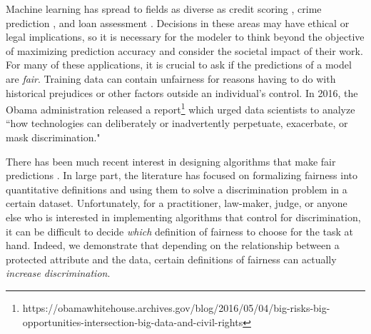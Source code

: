 Machine learning has spread to fields as diverse as credit scoring
\cite{khandani2010consumer}, crime prediction
\cite{brennan2009evaluating}, and loan assessment
\cite{mahoney2007method}. Decisions in these areas may have ethical or
legal implications, so it is necessary for the modeler to think beyond
the objective of maximizing prediction accuracy and consider the
societal impact of their work.
For many of these applications, it is crucial to ask if the
predictions of a model are \emph{fair}.  Training data can contain
unfairness for reasons having to do with historical prejudices or
other factors outside an individual's control.
In 2016, the Obama administration released a
report\footnote{https://obamawhitehouse.archives.gov/blog/2016/05/04/big-risks-big-opportunities-intersection-big-data-and-civil-rights}
which urged data scientists to analyze ``how technologies can
deliberately or inadvertently perpetuate, exacerbate, or mask
discrimination."

There has been much recent interest in designing algorithms that make
fair predictions
\cite{hardt2016equality,dwork2012fairness,joseph2016rawlsian,kamishima2011fairness,zliobaite2015survey,zafar2016fairness,zafar2015learning,grgiccase,kleinberg:17,calders2010three,kamiran2012data,bolukbasi2016man,kamiran2009classifying,zemel2013learning,louizos2015variational}.
In large part, the literature has focused on formalizing fairness into
quantitative definitions and using them to solve a discrimination
problem in a certain dataset. Unfortunately, for a practitioner,
law-maker, judge, or anyone else who is interested in implementing
algorithms that control for discrimination, it can be difficult to
decide {\em which} definition of fairness to choose for the task at
hand. Indeed, we demonstrate that depending on the relationship
between a protected attribute and the data, certain definitions of
fairness can actually \emph{increase discrimination}.

